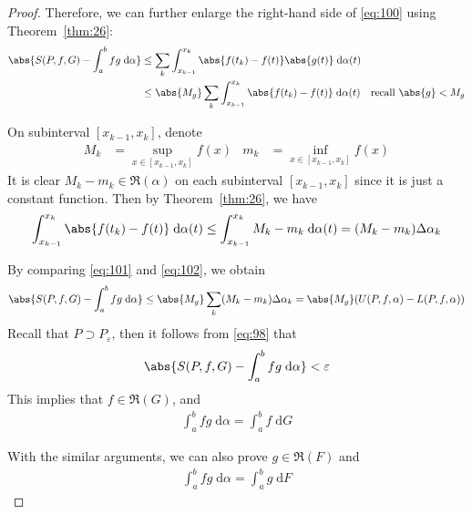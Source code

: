 \documentclass[thmcnt=section, 12pt]{elegantbook}
\begin{document}
\begin{proof}
    \par Therefore, we can further enlarge the right-hand side of \eqref{eq:100} using Theorem~\ref{thm:26}:
    \begin{align}
        \abs{
            S(P, f, G)
            - \int_a^b fg \; \mathrm{d}\alpha
        }  
        &\leq \sum_k \int_{x_{k-1}}^{x_k} \abs{f(t_k) - f(t)} \abs{g(t)} \; \mathrm{d}\alpha(t) \nonumber \\ 
        &\leq \abs{M_g} \sum_k \int_{x_{k-1}}^{x_k} \abs{f(t_k) - f(t)} \; \mathrm{d}\alpha(t)
        \quad \text{recall $\abs{g} < M_g$}
        \label{eq:101}
    \end{align}

    \par On subinterval $[x_{k-1}, x_k]$, denote 
    \begin{align*}
        M_k &= \sup_{x \in [x_{k-1}, x_k]} f(x) &
        m_k &= \inf_{x \in [x_{k-1}, x_k]} f(x)
    \end{align*}
    It is clear $M_k - m_k \in \mathfrak{R}(\alpha)$ on each subinterval $[x_{k-1}, x_k]$ since it is just a constant function. Then by Theorem~\ref{thm:26}, we have 
    \begin{align}
        \int_{x_{k-1}}^{x_k} \abs{f(t_k) - f(t)} \; \mathrm{d}\alpha(t)
        \leq \int_{x_{k-1}}^{x_k} M_k - m_k \; \mathrm{d}\alpha(t)
        = (M_k - m_k) \Delta\alpha_k
        \label{eq:102}
    \end{align}

    \par By comparing \eqref{eq:101} and \eqref{eq:102}, we obtain 
    \begin{align*}
        \abs{
            S(P, f, G)
            - \int_a^b fg \; \mathrm{d}\alpha
        }  
        \leq \abs{M_g} \sum_k (M_k - m_k) \Delta\alpha_k 
        = \abs{M_g} ( U(P, f, \alpha) - L(P, f, \alpha) )
    \end{align*}
    Recall that $P \supset P_\varepsilon$, then it follows from \eqref{eq:98} that 
    \begin{align*}
        \abs{
            S(P, f, G)
            - \int_a^b fg \; \mathrm{d}\alpha
        }  < \varepsilon
    \end{align*}
    This implies that $f \in \mathfrak{R}(G)$, and 
    \begin{align*}
        \int_a^b fg \; \mathrm{d}\alpha
        = \int_a^b f \; \mathrm{d}G
    \end{align*}

    \par With the similar arguments, we can also prove $g \in \mathfrak{R}(F)$ and 
    \begin{align*}
        \int_a^b fg \; \mathrm{d}\alpha
        = \int_a^b g \; \mathrm{d}F
    \end{align*}
\end{proof}
\end{document}
